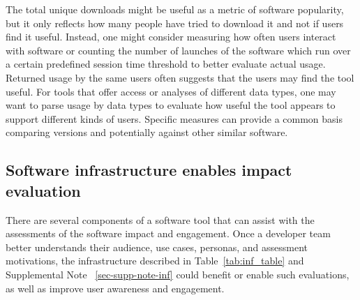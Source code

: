 \documentclass{article}
\begin{document}
The total unique downloads might be useful as a metric of software popularity, but it only reflects how many people have tried to download it and not if users find it useful. Instead, one might consider measuring how often users interact with software or counting the number of launches of the software which run over a certain predefined session time threshold to better evaluate actual usage. Returned usage by the same users often suggests that the users may find the tool useful. For tools that offer access or analyses of different data types, one may want to parse usage by data types to evaluate how useful the tool appears to support different kinds of users.   Specific measures can provide a common basis comparing versions and potentially against other similar software.


\subsection{Software infrastructure enables impact evaluation}
There are several components of a software tool that can assist with the assessments of the software impact and engagement. Once a developer team better understands their audience, use cases, personas, and assessment motivations, the infrastructure described in Table~\ref{tab:inf_table} and Supplemental Note ~\ref{sec-supp-note-inf} could benefit or enable such evaluations, as well as improve user awareness and engagement.
\end{document}
